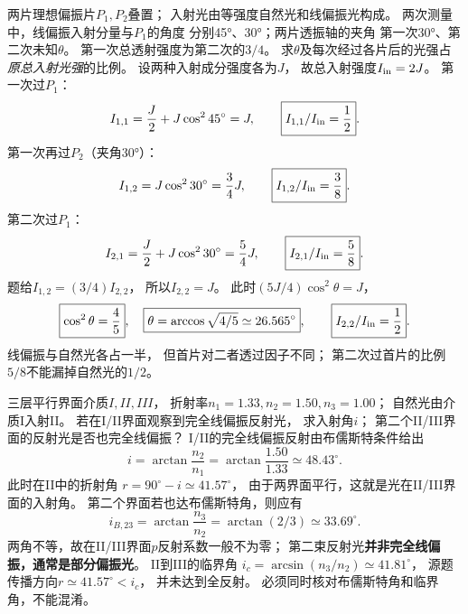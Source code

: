 \problemtext 两片理想偏振片$P_1,P_2$叠置；
入射光由等强度自然光和线偏振光构成。
两次测量中，线偏振入射分量与$P_1$的角度
分别45°、30°；两片透振轴的夹角
第一次30°、第二次未知$\theta$。
第一次总透射强度为第二次的$3/4$。
求$\theta$及每次经过各片后的光强占\emph{原总入射光强}的比例。
\workings
设两种入射成分强度各为$J$，
故总入射强度$I_{\rm in}=2J$。
第一次过$P_1$：
\[
 I_{1,1}=\frac J2+J\cos^245^\circ=J,
 \qquad\boxed{I_{1,1}/I_{\rm in}=\frac12}.
\]
第一次再过$P_2$（夹角30°）：
\[
 I_{1,2}=J\cos^230^\circ=\frac34J,
 \qquad\boxed{I_{1,2}/I_{\rm in}=\frac38}.
\]
第二次过$P_1$：
\[
 I_{2,1}=\frac J2+J\cos^230^\circ
 =\frac54J,\qquad
 \boxed{I_{2,1}/I_{\rm in}=\frac58}.
\]
题给$I_{1,2}=(3/4)I_{2,2}$，
所以$I_{2,2}=J$。
此时$(5J/4)\cos^2\theta=J$，
\[
\boxed{\cos^2\theta=\frac45},\quad
\boxed{\theta=\arccos\sqrt{4/5}
\simeq26.565^\circ},\qquad
\boxed{I_{2,2}/I_{\rm in}=\frac12}.
\]
\crosscheck 线偏振与自然光各占一半，
但首片对二者透过因子不同；
第二次过首片的比例$5/8$不能漏掉自然光的$1/2$。

\problemtext 三层平行界面介质$I,II,III$，
折射率$n_1=1.33,n_2=1.50,n_3=1.00$；
自然光由介质I入射II。
若在I/II界面观察到完全线偏振反射光，
求入射角$i$；
第二个II/III界面的反射光是否也完全线偏振？
\workings
I/II的完全线偏振反射由布儒斯特条件给出
\[
\boxed{i=\arctan\frac{n_2}{n_1}
=\arctan\frac{1.50}{1.33}\simeq48.43^\circ}.
\]
此时在II中的折射角
$r=90^\circ-i\simeq41.57^\circ$，
由于两界面平行，这就是光在II/III界面的入射角。
第二个界面若也达布儒斯特角，则应有
\[
 i_{B,23}=\arctan\frac{n_3}{n_2}
 =\arctan(2/3)\simeq33.69^\circ.
\]
两角不等，故在II/III界面$p$反射系数一般不为零；
第二束反射光\textbf{并非完全线偏振，通常是部分偏振光}。
\crosscheck II到III的临界角
$i_c=\arcsin(n_3/n_2)\simeq41.81^\circ$，
源题传播方向$r\simeq41.57^\circ<i_c$，
并未达到全反射。
必须同时核对布儒斯特角和临界角，不能混淆。
